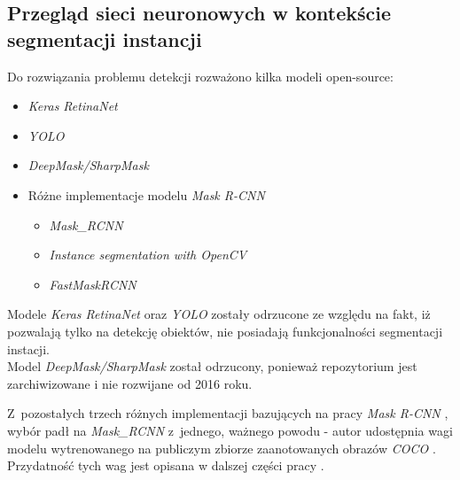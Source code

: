 \subsection{Przegląd sieci neuronowych w kontekście segmentacji instancji}

Do rozwiązania problemu detekcji rozważono kilka modeli open-source:

\begin{itemize}
	\item \textit{Keras RetinaNet} \cite{keras-retinanet} \cite{keras-retinanet-implementation}
	\item \textit{YOLO} \cite{yolo} \cite{yolo-implementation}
	\item \textit{DeepMask/SharpMask} \cite{deep-sharp-mask}
	\item Różne implementacje modelu \textit{Mask R-CNN} \cite{general-mask-rcnn}
		\begin{itemize}
			\item \textit{Mask\_RCNN} \cite{matterport-mask-rcnn}
			\item \textit{Instance segmentation with OpenCV} \cite{mask-rcnn-opencv}
			\item \textit{FastMaskRCNN} \cite{fast-mask-rcnn}
		\end{itemize}
\end{itemize}

Modele \textit{Keras RetinaNet} oraz \textit{YOLO} zostały odrzucone ze względu na fakt, iż pozwalają tylko na detekcję obiektów, nie posiadają funkcjonalności segmentacji instacji. \\

Model \textit{DeepMask/SharpMask} został odrzucony, ponieważ repozytorium jest zarchiwizowane i nie rozwijane od 2016 roku.

Z~pozostałych trzech różnych implementacji bazujących na pracy \textit{Mask R-CNN} \cite{general-mask-rcnn}, wybór padł na \textit{Mask\_RCNN} \cite{matterport-mask-rcnn} z~jednego, ważnego powodu - autor udostępnia wagi modelu wytrenowanego na publiczym zbiorze zaanotowanych obrazów \textit{COCO} \cite{coco}.
Przydatność tych wag jest opisana w dalszej części pracy .
